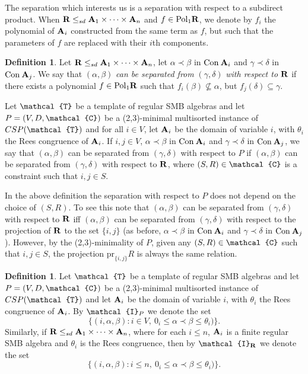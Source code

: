 \documentclass[11pt]{amsart}
\newcommand{\m}[1]{{\uppercase {\mathbf {#1}}}}
\newcommand{\vr}[1]{{\uppercase {\mathcal{#1}}}}
\newcommand{\poln}[2]{{\rm Pol_{#1}\m #2}}
\theoremstyle{definition}
\newtheorem{df}[thm]{Definition}
\begin{document}
The separation which interests us is a separation with respect to a subdirect product. When $\m R\leq_{sd}\m a_1\times\dots\times\m a_n$ and $f\in\poln{1}{r}$, we denote by $f_i$ the polynomial of $\m a_i$ constructed from the same term as $f$, but such that the parameters of $f$ are replaced with their $i$th components.

\begin{df}\label{sep2}
Let $\m R\leq_{sd}\m a_1\times\dots\times\m a_n$, let $\alpha\prec\beta$ in $\mathrm{Con}\:\m a_i$ and $\gamma\prec\delta$ in $\mathrm{Con}\:\m a_j$. We say that $(\alpha,\beta)$ {\em can be separated from} $(\gamma,\delta)$ {\em with respect to} $\m R$ if there exists a polynomial $f\in \mathrm{Pol}_1\m r$ such that $f_i(\beta)\nsubseteq\alpha$, but $f_j(\delta)\subseteq\gamma$. 

Let $\vr t$ be a template of regular SMB algebras and let $P=(V,D,\vr c)$ be a (2,3)-minimal multisorted instance of $CSP(\vr t)$ and for all $i\in V$, let $\m a_i$ be the domain of variable $i$, with $\theta_i$ the Rees congruence of $\m a_i$. If $i,j\in V$, $\alpha\prec\beta$ in $\mathrm{Con}\:\m a_i$ and $\gamma\prec\delta$ in $\mathrm{Con}\:\m a_j$, we say that $(\alpha,\beta)$ can be separated from $(\gamma,\delta)$ with respect to $P$ if $(\alpha,\beta)$ can be separated from $(\gamma,\delta)$ with respect to $\m R$, where $(S,R)\in\vr c$ is a constraint such that $i,j\in S$.
\end{df}

In the above definition the separation with respect to $P$ does not depend on the choice of $(S,R)$. To see this note that $(\alpha,\beta)$ can be separated from $(\gamma,\delta)$ with respect to $\m R$ iff $(\alpha,\beta)$ can be separated from $(\gamma,\delta)$ with respect to the projection of $\m R$ to the set $\{i,j\}$ (as before, $\alpha\prec\beta$ in $\mathrm{Con}\:\m a_i$ and $\gamma\prec\delta$ in $\mathrm{Con}\:\m a_j$). However, by the (2,3)-minimality of $P$, given any $(S,R)\in\vr c$ such that $i,j\in S$, the projection $\mathrm{pr}_{\{i,j\}}R$ is always the same relation.

\begin{df}
Let $\vr t$ be a template of regular SMB algebras and let $P=(V,D,\vr c)$ be a (2,3)-minimal multisorted instance of $CSP(\vr t)$ and let $\m a_i$ be the domain of variable $i$, with $\theta_i$ the Rees congruence of $\m a_i$. By $\vr i_{P}$ we denote the set \[\{(i,\alpha,\beta):i\in V,\: 0_i\leq \alpha\prec\beta\leq \theta_i)\}.\]
Similarly, if $\m R\leq_{sd}\m a_1\times\dots\times\m a_n$, where for each $i\leq n$, $\m a_i$ is a finite regular SMB algebra and $\theta_i$ is the Rees congruence, then by $\vr i_{\m R}$ we denote the set \[\{(i,\alpha,\beta): i\leq n,\: 0_i\leq \alpha\prec\beta\leq \theta_i)\}.\]
\end{df}
\end{document}
